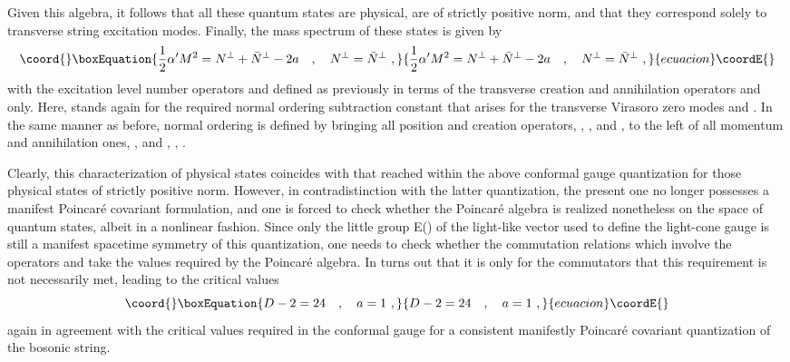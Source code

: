 \documentclass[a4paper,11pt]{article}
\begin{document}
Given this algebra, it follows that all these quantum states are physical,
are of strictly positive norm, and that they correspond solely to
transverse string excitation modes. Finally, the mass spectrum of these
states is given by
\begin{equation}\coord{}\boxEquation{
\frac{1}{2}\alpha' M^2=N^\perp+\bar{N}^\perp-2a\ \ \ ,\ \ \ 
N^\perp=\bar{N}^\perp\ ,
}{
\frac{1}{2}\alpha' M^2=N^\perp+\bar{N}^\perp-2a\ \ \ ,\ \ \ 
N^\perp=\bar{N}^\perp\ ,
}{ecuacion}\coordE{}\end{equation}
with the excitation level number operators \coordHE{} and \coordHE{}
defined as previously in terms of the transverse creation and annihilation
operators \myHighlight{$\alpha^i_n$}\coordHE{} and \myHighlight{$\bar{\alpha}^i_n$}\coordHE{} only. Here, \coordHE{} stands
again for the required normal ordering subtraction constant that arises
for the transverse Virasoro zero modes \myHighlight{$L^\perp_0$}\coordHE{} and \myHighlight{$\bar{L}^\perp_0$}\coordHE{}.
In the same manner as before, normal ordering is defined by bringing all
position and creation operators, \myHighlight{$q^-$}\coordHE{}, \myHighlight{$q^i$}\coordHE{}, \coordHE{}
and \myHighlight{$\bar{\alpha}^i_{-n}$}\coordHE{}, to the left of all momentum and annihilation 
ones, \myHighlight{$P^+$}\coordHE{}, \myHighlight{$P^i$}\coordHE{} and \myHighlight{$\alpha^i_n$}\coordHE{}, \coordHE{}, \coordHE{}.

Clearly, this characterization of physical states coincides with that
reached within the above conformal gauge quantization for those physical
states of strictly positive norm. However, in contradistinction with the
latter quantization, the present one no longer possesses a manifest Poincar\'e
covariant formulation, and one is forced to check whether the Poincar\'e
algebra is rea\-li\-zed nonetheless on the space of quantum states, albeit in
a nonlinear fashion. Since only the little group E(\myHighlight{$D-2$}\coordHE{})\coordHE{} of the 
light-like vector \myHighlight{$n^\mu$}\coordHE{} used to define the light-cone gauge is still a 
manifest spacetime symmetry of this quantization, one needs to check whether 
the commutation relations which involve the operators \myHighlight{$M^{-i}$}\coordHE{} and \coordHE{}
take the values required by the Poincar\'e algebra. In turns out that it is
only for the commutators \myHighlight{$[M^{-i},M^{-j}]=0$}\coordHE{} that this requirement is
not necessarily met, leading to the critical values\cite{Pol,GSW,JG10}
\begin{equation}\coord{}\boxEquation{
D-2=24\ \ \ ,\ \ \ a=1\ ,
}{
D-2=24\ \ \ ,\ \ \ a=1\ ,
}{ecuacion}\coordE{}\end{equation}
again in agreement with the critical values required in the conformal
gauge for a consistent manifestly Poincar\'e covariant quantization of
the bosonic string.
\end{document}
